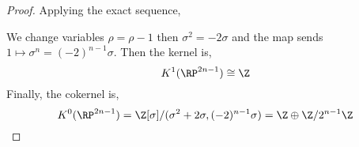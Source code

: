 \documentclass[12pt]{extarticle}
\begin{document}
\begin{proof}
Applying the exact sequence,
\begin{center}
\end{center}
We change variables $\rho = \rho - 1$ then $\sigma^2 = - 2 \sigma$ and the map sends $1 \mapsto \sigma^n = (-2)^{n-1} \sigma$. Then the kernel is,
\[ K^1(\RP^{2n - 1}) \cong \Z \]
Finally, the cokernel is,
\[ K^0(\RP^{2n - 1}) = \Z[\sigma]/(\sigma^2 + 2 \sigma, (-2)^{n-1} \sigma) = \Z \oplus \Z/2^{n-1} \Z \]
\end{proof}
\end{document}
